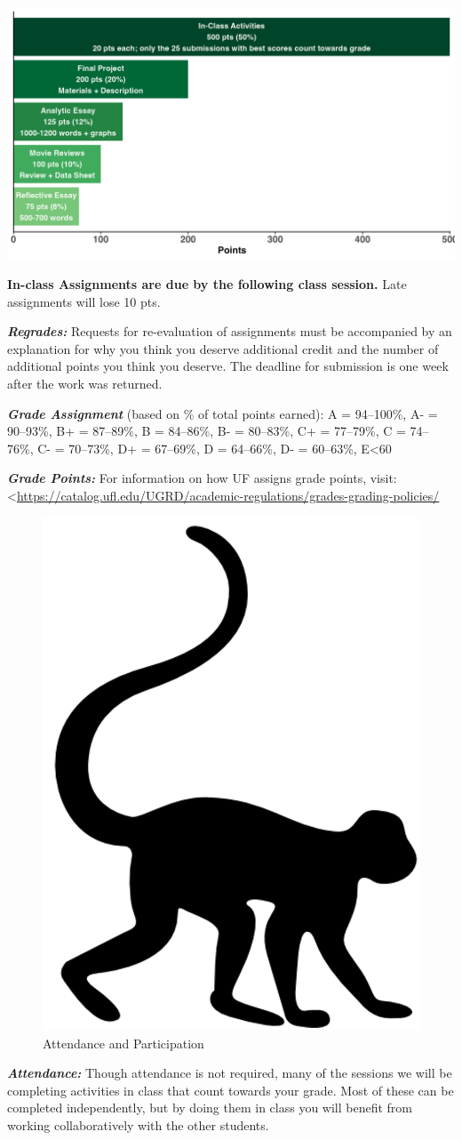 \documentclass[
  12pt,
]{article}
\begin{document}
\begin{center}\includegraphics[width=0.85\linewidth]{./icons/hw} \end{center}

\textbf{In-class Assignments are due by the following class session.}
Late assignments will lose 10 pts.

\textbf{\emph{Regrades:}} Requests for re-evaluation of assignments must
be accompanied by an explanation for why you think you deserve
additional credit and the number of additional points you think you
deserve. The deadline for submission is one week after the work was
returned.

\textbf{\emph{Grade Assignment}} (based on \% of total points earned): A
= 94--100\%, A- = 90--93\%, B+ = 87--89\%, B = 84--86\%, B- = 80--83\%,
C+ = 77--79\%, C = 74--76\%, C- = 70--73\%, D+ = 67--69\%, D = 64--66\%,
D- = 60--63\%, E\textless60

\textbf{\emph{Grade Points:}} For information on how UF assigns grade
points, visit:
\newline \textless{}\url{https://catalog.ufl.edu/UGRD/academic-regulations/grades-grading-policies/}

\begin{figure}

\includegraphics[width=0.03\linewidth]{./icons/monkey} \hfill{}

\caption{Attendance and Participation}\label{fig:attendance}
\end{figure}

\vspace{-0.3cm}

\textbf{\emph{Attendance:}} Though attendance is not required, many of
the sessions we will be completing activities in class that count
towards your grade. Most of these can be completed independently, but by
doing them in class you will benefit from working collaboratively with
the other students.
\end{document}
